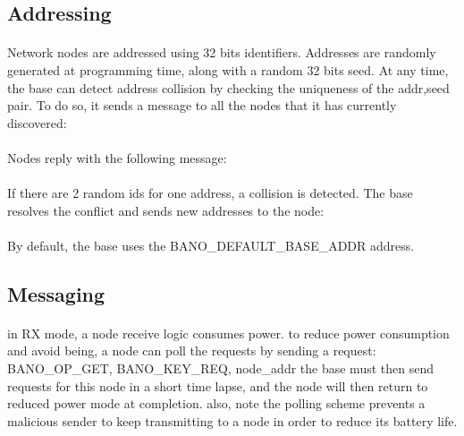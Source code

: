 \documentclass[a4paper, 11pt]{article}
\begin{document}
\subsection{Addressing}
\paragraph{}
Network nodes are addressed using 32 bits identifiers. Addresses are randomly
generated at programming time, along with a random 32 bits seed. At any time,
the base can detect address collision by checking the uniqueness of the
addr,seed pair. To do so, it sends a message to all the nodes that it has
currently discovered:

\paragraph{}
Nodes reply with the following message:

\paragraph{}
If there are 2 random ids for one address, a collision is detected. The base
resolves the conflict and sends new addresses to the node:

\paragraph{}
By default, the base uses the BANO_DEFAULT_BASE_ADDR address.


\subsection{Messaging}
\paragraph{}
in RX mode, a node receive logic consumes power. to reduce power consumption and
avoid being, a node can poll the requests by sending a request:
BANO_OP_GET, BANO_KEY_REQ, node_addr
the base must then send requests for this node in a short time lapse, and the
node will then return to reduced power mode at completion.
also, note the polling scheme prevents a malicious sender to
keep transmitting to a node in order to reduce its battery life.
\end{document}
